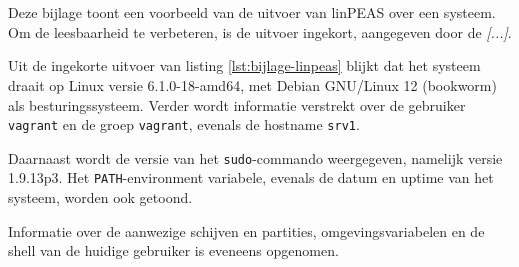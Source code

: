 
\chapter{}%
\label{ch:bijlage_linpeas}

Deze bijlage toont een voorbeeld van de uitvoer van linPEAS over een systeem.
Om de leesbaarheid te verbeteren, is de uitvoer ingekort, aangegeven door de \textit{[...]}. 

Uit de ingekorte uitvoer van listing \ref{lst:bijlage-linpeas} blijkt dat het systeem draait op Linux versie 6.1.0-18-amd64, met Debian GNU/Linux 12 (bookworm) als besturingssysteem.
Verder wordt informatie verstrekt over de gebruiker \texttt{vagrant} en de groep \texttt{vagrant}, evenals de hostname \texttt{srv1}.

Daarnaast wordt de versie van het \texttt{sudo}-commando weergegeven, namelijk versie 1.9.13p3.
Het \texttt{PATH}-environment variabele, evenals de datum en uptime van het systeem, worden ook getoond.

Informatie over de aanwezige schijven en partities, omgevingsvariabelen en de shell van de huidige gebruiker is eveneens opgenomen.

